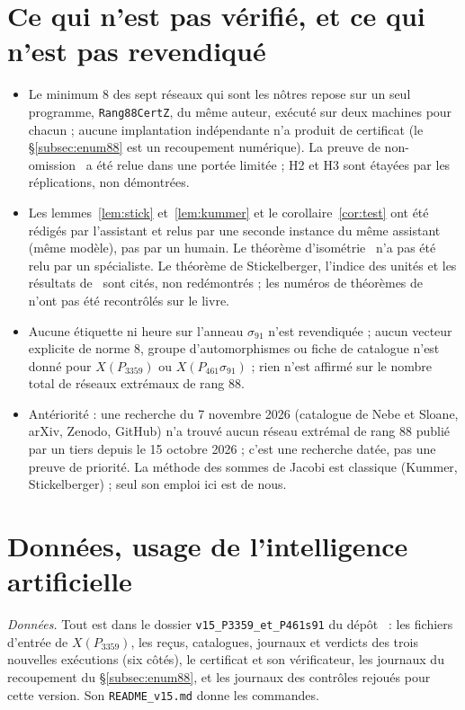 \documentclass[11pt,a4paper]{amsart}
\theoremstyle{plain}
\theoremstyle{definition}
\newcommand{\XA}{X(P_{3359})}
\newcommand{\XB}{X(P_{461}\sigma_{91})}
\begin{document}
\section{Ce qui n'est pas vérifié, et ce qui n'est pas revendiqué}\label{sec:limites}
\begin{itemize}
\item Le minimum $8$ des sept réseaux qui sont les nôtres repose sur un seul programme, \texttt{Rang88CertZ}, du même auteur, exécuté sur deux machines pour chacun ; aucune implantation indépendante n'a produit de certificat (le \S\ref{subsec:enum88} est un recoupement numérique). La preuve de non-omission~\cite[th.~5.1]{Gau26} a été relue dans une portée limitée ; H2 et H3 sont étayées par les réplications, non démontrées.
\item Les lemmes~\ref{lem:stick} et~\ref{lem:kummer} et le corollaire~\ref{cor:test} ont été rédigés par l'assistant et relus par une seconde instance du même assistant (même modèle), pas par un humain. Le théorème d'isométrie~\cite[th.~3.3]{Gau26} n'a pas été relu par un spécialiste. Le théorème de Stickelberger, l'indice des unités et les résultats de~\cite{Sak26} sont cités, non redémontrés ; les numéros de théorèmes de~\cite{Was97} n'ont pas été recontrôlés sur le livre.
\item Aucune étiquette ni heure sur l'anneau $\sigma_{91}$ n'est revendiquée ; aucun vecteur explicite de norme $8$, groupe d'automorphismes ou fiche de catalogue n'est donné pour $\XA$ ou $\XB$ ; rien n'est affirmé sur le nombre total de réseaux extrémaux de rang $88$.
\item Antériorité : une recherche du 7 novembre 2026 (catalogue de Nebe et Sloane, arXiv, Zenodo, GitHub) n'a trouvé aucun réseau extrémal de rang $88$ publié par un tiers depuis le 15 octobre 2026 ; c'est une recherche datée, pas une preuve de priorité. La méthode des sommes de Jacobi est classique (Kummer, Stickelberger) ; seul son emploi ici est de nous.
\end{itemize}

\section*{Données, usage de l'intelligence artificielle}
\emph{Données.} Tout est dans le dossier \texttt{v15\_P3359\_et\_P461s91} du dépôt~\cite{Gau26b} : les fichiers d'entrée de $\XA$, les reçus, catalogues, journaux et verdicts des trois nouvelles exécutions (six côtés), le certificat et son vérificateur, les journaux du recoupement du \S\ref{subsec:enum88}, et les journaux des contrôles rejoués pour cette version. Son \texttt{README\_v15.md} donne les commandes.
\end{document}
